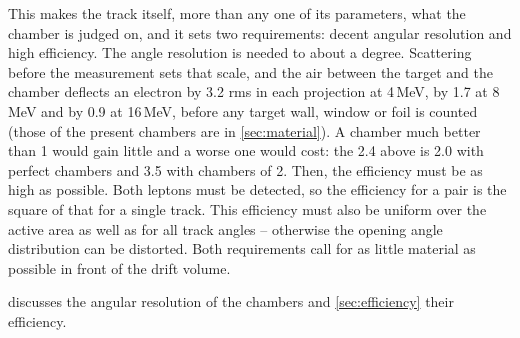This makes the track itself, more than any one of its parameters, what the chamber is judged on, and it sets two requirements: decent angular resolution and high efficiency. The angle resolution is needed to about a degree. Scattering before the measurement sets that scale, and the
air between the target and the chamber deflects an electron by 3.2\textdegree{} rms in each projection
at 4\,MeV, by 1.7\textdegree{} at 8\,MeV and by 0.9\textdegree{} at 16\,MeV, before any target wall, window or foil is
counted (those of the present chambers are in \cref{sec:material}). A chamber much better than 1\textdegree{} would
gain little and a worse one would cost: the 2.4\textdegree{} above is 2.0\textdegree{} with perfect chambers and
3.5\textdegree{} with chambers of 2\textdegree. Then, the efficiency must be as high as possible. Both leptons must be detected, so the efficiency for a pair is the square of that for a single track. This efficiency must also be uniform over the active area as well as for all track angles -- otherwise the opening angle distribution can be distorted. Both requirements call for as little
material as possible in front of the drift volume.

 discusses the angular resolution of the chambers and \cref{sec:efficiency} their efficiency.
